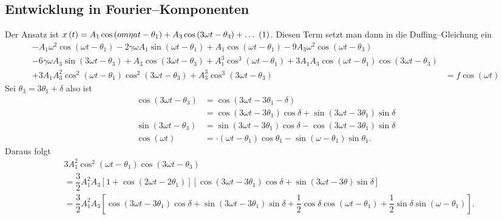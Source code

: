 \documentclass[a4paper,12pt]{article}
\newcommand\inlineeqno{\stepcounter{equation}\ {(\theequation)}}
\numberwithin{equation}{section}
\begin{document}
\subsection{Entwicklung in Fourier--Komponenten}
Der Ansatz ist $x\left(t\right)=A_1\cos \left(om\eta at-\theta _1\right)+A_3\cos \left(3\omega t-\theta _3\right)+\hdots \inlineeqno\label{eq:9.54}$. Diesen Term setzt man dann in die Duffing--Gleichung ein
\begin{multline*}
        -A_1\omega ^2\cos \left(\omega t-\theta _1\right)-2\gamma \omega A_1\sin \left(\omega t-\theta _1\right)+A_1\cos \left(\omega t-\theta _1\right)-9A_3\omega ^2\cos \left(\omega t-\theta _3\right)\\
        -6\gamma \omega A_3\sin \left(3\omega t-\theta _3\right)+A_3\cos \left(3\omega t-\theta _3\right)+A_1^3\cos ^3\left(\omega t-\theta _1\right)+3A_1A_3\cos \left(\omega t-\theta _1\right)\cos \left(3\omega t-\theta _3\right)\\
        +3A_1A_3^2\cos ^2\left(\omega t-\theta _1\right)\cos ^2\left(3\omega t-\theta _3\right)+A_3^3\cos ^3\left(3\omega t-\theta _3\right)&=f\cos \left(\omega t\right)
\end{multline*}
Sei $\theta _3=3\theta _1+\delta $ also ist
\begin{align*} 
        \cos \left(3\omega t-\theta _3\right)&=\cos \left(3\omega t-3\theta _1-\delta \right)\\
                                             &=\cos \left(3\omega t-3\theta _1\right)\cos \delta +\sin \left(3\omega t-3\theta _1\right)\sin \delta \\
        \sin \left(3\omega t-\theta _3\right)&=\sin \left(3\omega t-3\theta _1\right)\cos \delta -\cos \left(3\omega t-3\theta _1\right)\sin \delta \\
        \cos \left(\omega t\right)&=\cdot \left(\omega t-\theta _1\right)\cos \theta _1-\sin \left(\omega -\theta _1\right)\sin \theta _1
.\end{align*} 
Daraus folgt
\begin{align*} 
        &3A_1^2\cos ^2\left(\omega t-\theta _1\right)\cos \left(3\omega t-\theta _3\right)\\
        &=\dfrac{3}{2}A_1^2A_3\left[1+\cos \left(2\omega t-2\theta _1\right)\right]\left[\cos \left(3\omega t-3\theta _1\right)\cos \delta +\sin \left(3\omega t-3\theta \right)\sin \delta \right]\\
        &=\dfrac{3}{2}A_1^2A_3\left[\cos \left(3\omega t-3\theta _1\right)\cos \delta +\sin \left(3\omega t-3\theta _1\right)\sin \delta +\dfrac{1}{2}\cos \delta \cos \left(\omega t-\theta _1\right)+\dfrac{1}{2}\sin \delta \sin \left(\omega -\theta _1\right)\right]
.\end{align*} 
\end{document}

